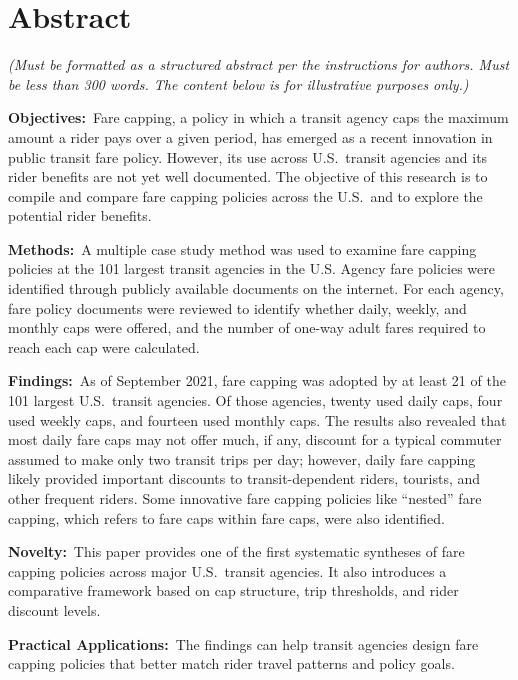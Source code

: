 \documentclass[12pt,letterpaper]{article}
\newcommand{\abshead}[1]{\textbf{#1}\ }
\begin{document}
\section{Abstract}
\noindent\textit{(Must be formatted as a structured abstract per the instructions
for authors. Must be less than 300 words. The content below is for illustrative
purposes only.)}

\justifying  %

\abshead{Objectives:}Fare capping, a policy in which a transit agency caps the
maximum amount a rider pays over a given period, has emerged as a recent innovation
in public transit fare policy. However, its use across U.S.\ transit agencies and
its rider benefits are not yet well documented. The objective of this research is to
compile and compare fare capping policies across the U.S.\ and to explore the
potential rider benefits.

\abshead{Methods:}A multiple case study method was used to examine fare capping
policies at the 101 largest transit agencies in the U.S. Agency fare policies were
identified through publicly available documents on the internet. For each agency,
fare policy documents were reviewed to identify whether daily, weekly, and monthly
caps were offered, and the number of one-way adult fares required to reach each cap
were calculated.

\abshead{Findings:}As of September 2021, fare capping was adopted by at least 21 of
the 101 largest U.S.\ transit agencies. Of those agencies, twenty used daily caps,
four used weekly caps, and fourteen used monthly caps. The results also revealed that
most daily fare caps may not offer much, if any, discount for a typical commuter
assumed to make only two transit trips per day; however, daily fare capping likely
provided important discounts to transit-dependent riders, tourists, and other
frequent riders. Some innovative fare capping policies like ``nested'' fare capping,
which refers to fare caps within fare caps, were also identified.

\abshead{Novelty:}This paper provides one of the first systematic syntheses of fare
capping policies across major U.S.\ transit agencies. It also introduces a
comparative framework based on cap structure, trip thresholds, and rider discount
levels.

\abshead{Practical Applications:}The findings can help transit agencies design fare
capping policies that better match rider travel patterns and policy goals.

\RaggedRight  %
\end{document}
